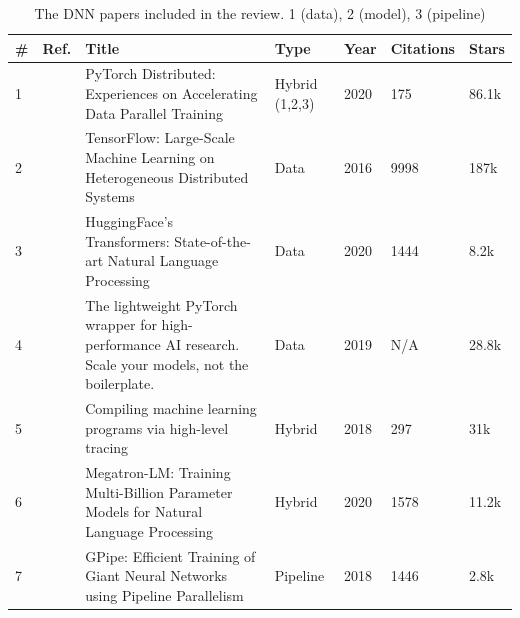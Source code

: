 \begin{table}[htbp]
	\centering
	\caption{The DNN papers included in the review. 1 (data), 2 (model), 3 (pipeline)}
	\label{tab:dnn_papers}
	\begin{tabular}{llp{8.01cm}p{2cm}lll}
		\hline
		\textbf{\#} & \textbf{Ref.}                    & \textbf{Title}                                                                                            & \textbf{Type}  & \textbf{Year} & \textbf{Citations} & \textbf{Stars}                                                \\[1ex]
		\hline
		1           & \cite{li_pytorch_2020}           & PyTorch Distributed: Experiences on Accelerating Data Parallel Training                                   & Hybrid (1,2,3) & 2020          & 175                & 86.1k \cite{noauthor_pytorchpytorch_nodate}                   \\[1ex]
		2           & \cite{abadi_tensorflow_2016}     & TensorFlow: Large-Scale Machine Learning on Heterogeneous Distributed Systems                             & Data           & 2016          & 9998               & 187k \cite{abadi_tensorflow_2015}                             \\[1ex]
		3           & \cite{wolf_huggingfaces_2020}    & HuggingFace's Transformers: State-of-the-art Natural Language Processing                                  & Data           & 2020          & 1444               & 8.2k \cite{noauthor_huggingfaceaccelerate_2025}               \\[1ex]
		4           & \cite{noauthor_overview_nodate}  & The lightweight PyTorch wrapper for high-performance AI research. Scale your models, not the boilerplate. & Data           & 2019          & N/A                & 28.8k \cite{falcon_pytorch_2019}                              \\[1ex]
		5           & \cite{frostig_compiling_nodate}  & Compiling machine learning programs via high-level tracing                                                & Hybrid         & 2018          & 297                & 31k \cite{noauthor_jax-mljax_2025}                            \\[1ex]
		6           & \cite{shoeybi_megatron-lm_2020}  & Megatron-LM: Training Multi-Billion Parameter Models for Natural Language Processing                      & Hybrid         & 2020          & 1578               & 11.2k \cite{noauthor_nvidiamegatron-lm_2025}                  \\[1ex]
		7           & \cite{huang_gpipe_2019}          & GPipe: Efficient Training of Giant Neural Networks using Pipeline Parallelism                             & Pipeline       & 2018          & 1446               & 2.8k \cite{noauthor_tensorflowlingvo_2025}                    \\[1ex]

\end{tabular}
\end{table}
